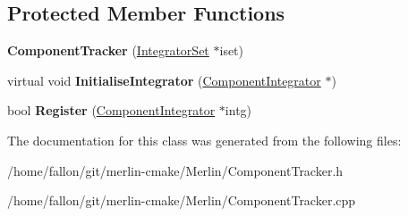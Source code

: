 \subsection*{Protected Member Functions}
\begin{DoxyCompactItemize}
\item 
\mbox{\label{classComponentTracker_adb4cf1da1962de439a3ce3aa004fce02}} 
{\bfseries Component\+Tracker} (\hyperlink{classComponentTracker_1_1IntegratorSet}{Integrator\+Set} $\ast$iset)
\item 
\mbox{\label{classComponentTracker_a121e9c22544f5dfec001e5cb0e2c5a61}} 
virtual void {\bfseries Initialise\+Integrator} (\hyperlink{classComponentIntegrator}{Component\+Integrator} $\ast$)
\item 
\mbox{\label{classComponentTracker_a3d08499122659d456fc3bf1189e46979}} 
bool {\bfseries Register} (\hyperlink{classComponentIntegrator}{Component\+Integrator} $\ast$intg)
\end{DoxyCompactItemize}


The documentation for this class was generated from the following files\+:\begin{DoxyCompactItemize}
\item 
/home/fallon/git/merlin-\/cmake/\+Merlin/Component\+Tracker.\+h\item 
/home/fallon/git/merlin-\/cmake/\+Merlin/Component\+Tracker.\+cpp\end{DoxyCompactItemize}
